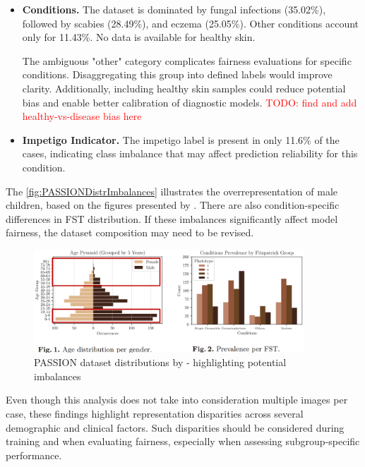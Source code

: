 \documentclass[12pt, a4paper, oneside]{book}   	%
\renewcommand{\todo}[1]{\textcolor{red}{TODO: #1}}
\begin{document}
\begin{itemize}
			\item \textbf{Conditions.} The dataset is dominated by fungal infections (35.02\%), followed by scabies (28.49\%), and eczema (25.05\%). Other conditions account only for 11.43\%. No data is available for healthy skin.
			
			The ambiguous "other" category complicates fairness evaluations for specific conditions. Disaggregating this group into defined labels would improve clarity. Additionally, including healthy skin samples could reduce potential bias and enable better calibration of diagnostic models. \todo{find and add healthy-vs-disease bias here}
			
			\item \textbf{Impetigo Indicator.} The impetigo label is present in only 11.6\% of the cases, indicating class imbalance that may affect prediction reliability for this condition.
		\end{itemize}
		
		The \autoref{fig:PASSIONDistrImbalances} illustrates the overrepresentation of male children, based on the figures presented by \textcite{Gottfrois2024}. There are also condition-specific differences in \gls{FST} distribution. If these imbalances significantly affect model fairness, the dataset composition may need to be revised.
		
		\begin{figure}[H]
			\centering
			\includegraphics[width=0.9\textwidth]{figures/PASSIONDatasetDistributionPotentialImbalances.png}
			\caption{PASSION dataset distributions by \textcite{Gottfrois2024} - highlighting potential imbalances}
			\label{fig:PASSIONDistrImbalances}
		\end{figure}
		
		Even though this analysis does not take into consideration multiple images per case, these findings highlight representation disparities across several demographic and clinical factors. Such disparities should be considered during training and when evaluating fairness, especially when assessing subgroup-specific performance.
		
\end{document}
